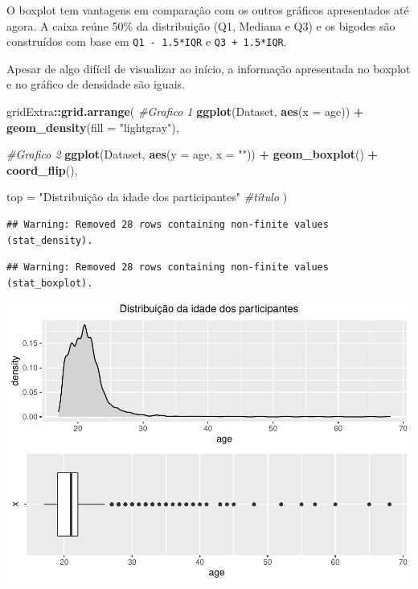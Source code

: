 \documentclass[
]{book}
\newenvironment{Shaded}{\begin{snugshade}}{\end{snugshade}}
\newcommand{\CommentTok}[1]{\textcolor[rgb]{0.56,0.35,0.01}{\textit{#1}}}
\newcommand{\DataTypeTok}[1]{\textcolor[rgb]{0.13,0.29,0.53}{#1}}
\newcommand{\KeywordTok}[1]{\textcolor[rgb]{0.13,0.29,0.53}{\textbf{#1}}}
\newcommand{\NormalTok}[1]{#1}
\newcommand{\OperatorTok}[1]{\textcolor[rgb]{0.81,0.36,0.00}{\textbf{#1}}}
\newcommand{\StringTok}[1]{\textcolor[rgb]{0.31,0.60,0.02}{#1}}
\begin{document}
O boxplot tem vantagens em comparação com os outros gráficos apresentados até agora. A caixa reúne 50\% da distribuição (Q1, Mediana e Q3) e os bigodes são construídos com base em \texttt{Q1\ -\ 1.5*IQR} e \texttt{Q3\ +\ 1.5*IQR}.

Apesar de algo difícil de visualizar ao início, a informação apresentada no boxplot e no gráfico de densidade são iguais.

\begin{Shaded}
\begin{Highlighting}[]
\NormalTok{gridExtra}\OperatorTok{::}\KeywordTok{grid.arrange}\NormalTok{(}
  \CommentTok{#Grafico 1}
  \KeywordTok{ggplot}\NormalTok{(Dataset, }\KeywordTok{aes}\NormalTok{(}\DataTypeTok{x =}\NormalTok{ age)) }\OperatorTok{+}
\StringTok{  }\KeywordTok{geom_density}\NormalTok{(}\DataTypeTok{fill =} \StringTok{"lightgray"}\NormalTok{),}
  
  \CommentTok{#Grafico 2}
  \KeywordTok{ggplot}\NormalTok{(Dataset, }\KeywordTok{aes}\NormalTok{(}\DataTypeTok{y =}\NormalTok{ age, }\DataTypeTok{x =} \StringTok{""}\NormalTok{)) }\OperatorTok{+}
\StringTok{  }\KeywordTok{geom_boxplot}\NormalTok{() }\OperatorTok{+}
\StringTok{  }\KeywordTok{coord_flip}\NormalTok{(),}
  
  \DataTypeTok{top =} \StringTok{"Distribuição da idade dos participantes"} \CommentTok{#título}
\NormalTok{)}
\end{Highlighting}
\end{Shaded}

\begin{verbatim}
## Warning: Removed 28 rows containing non-finite values (stat_density).
\end{verbatim}

\begin{verbatim}
## Warning: Removed 28 rows containing non-finite values (stat_boxplot).
\end{verbatim}

\begin{center}\includegraphics{gitbook-demo_files/figure-latex/unnamed-chunk-19-1} \end{center}
\end{document}
